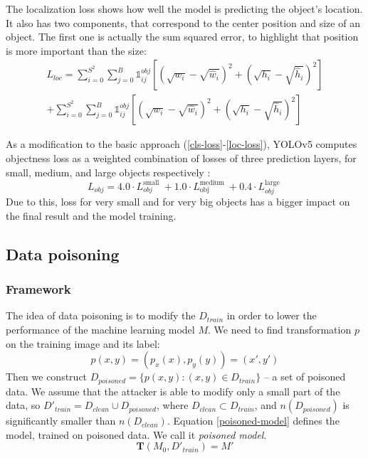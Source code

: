 \documentclass[14pt,a4paper]{extarticle}
\newcounter{e}
\numberwithin{equation}{section}
\numberwithin{figure}{section}
\begin{document}
The localization loss shows how well the model is predicting the object's location. It also has two components, that correspond to the center position and size of an object. The first one is actually the sum squared error, to highlight that position is more important than the size:
\begin{equation}
\begin{aligned}
\label{loc-loss}
L_{l o c} = \sum_{i=0}^{S^2} \sum_{j=0}^B \mathds{1}_{i j}^{o b j}\left[\left(\sqrt{w_i}-\sqrt{\widehat{w}_i}\right)^2+\left(\sqrt{h_i}-\sqrt{\widehat{h}_i}\right)^2\right]
\\
+ \sum_{i=0}^{S^2} \sum_{j=0}^B \mathds{1}_{i j}^{o b j}\left[\left(\sqrt{w_i}-\sqrt{\widehat{w}_i}\right)^2+\left(\sqrt{h_i}-\sqrt{\widehat{h}_i}\right)^2\right]
\end{aligned}
\end{equation}


As a modification to the basic approach (\ref{cls-loss}-\ref{loc-loss}), YOLOv5 computes objectness loss as a weighted combination of losses of three prediction layers, for small, medium, and large objects respectively \cite{yolov5-docks}:
\begin{equation}
L_{o b j}=4.0 \cdot L_{o b j}^{\text {small }}+1.0 \cdot L_{\text {obj }}^{\text {medium }}+0.4 \cdot L_{o b j}^{\text {large }}
\end{equation}
Due to this, loss for very small and for very big objects has a bigger impact on the final result and the model training.





\subsection{Data poisoning}

\subsubsection{Framework}

The idea of data poisoning is to modify the $D_{train}$ in order to lower the performance of the machine learning model $M$. We need to find transformation $p$ on the training image and its label:
\begin{equation}
    \label{poisoning}
    p(x, y) = (p_x(x), p_y(y)) = (x', y')
\end{equation}
Then we construct $D_{poisoned}=\{p(x, y) : (x, y) \in D_{train}\}$ -- a set of poisoned data. We assume that the attacker is able to modify only a small part of the data, so $D'_{train} = D_{clean} \cup D_{poisoned}$, where $D_{clean} \subset D_{train}$, and $n(D_{poisoned})$ is significantly smaller than $n(D_{clean})$. Equation \ref{poisoned-model} defines the model, trained on poisoned data. We call it \textit{poisoned model}.
\begin{equation}
    \label{poisoned-model}
    \mathbf{T}(M_{0}, D'_{train}) = M'
\end{equation}
\end{document}
